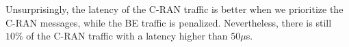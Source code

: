 \documentclass[]{algotel}
\newcommand{\todo}[1]{{\color{red} TODO: {#1}}}
\begin{document}
Unsurprisingly, the latency of the C-RAN traffic is better when we prioritize the C-RAN messages, while the BE traffic is penalized. Nevertheless, there is still $10\%$ of the C-RAN traffic with a latency higher than $50 \mu$s.


%    
%    
%
%
%
%
%  
%
%  
\end{document}
